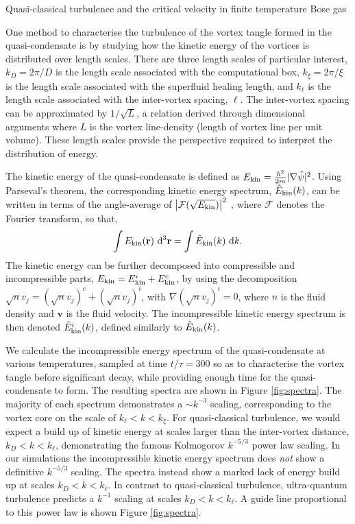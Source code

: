 \begin{chapter}{\label{cha:nonequib}Quasi-classical turbulence and the critical velocity in finite temperature Bose gas}
\begin{figure}
\end{figure}
One method to characterise the turbulence of the vortex tangle formed in the quasi-condensate is by studying how the kinetic energy of the vortices is distributed over length scales. There are three length scales of particular interest, $k_D=2\pi/D$ is the length scale associated with the computational box, $k_\xi = 2\pi/\xi$ is the length scale associated with the superfluid healing length, and $k_\ell$ is the length scale associated with the inter-vortex spacing, $\ell$. The inter-vortex spacing can be approximated by $1/\sqrt{L}$, a relation derived through dimensional arguments where $L$ is the vortex line-density (length of vortex line per unit volume). These length scales provide the perspective required to interpret the distribution of energy.

The kinetic energy of the quasi-condensate is defined as $E_{\rm kin} = \frac{\hbar^2}{2m}|\nabla \hat\psi|^2$.
 Using Parseval's theorem, the corresponding kinetic energy spectrum, $\hat{E}_{\rm kin}(k)$, can be written in terms of the angle-average of $\left |\mathcal{F}(\sqrt{E_{\rm kin}})\right |^2$ \cite{Nore},
where $\mathcal{F}$ denotes the Fourier transform, so that,
\begin{equation}
  \int E_{\rm kin}({\bf r})~{\rm d}^3{\bf r} = \int \hat{E}_{\rm kin}(k)~{\mathrm d}k.
  \label{eq:Ekin}
\end{equation}
The kinetic energy can be further decomposed into compressible and incompressible parts, $E_{\rm kin} = E^i_{\rm kin} + E^c_{\rm kin}$, by using the decomposition $\sqrt{n}v_j = (\sqrt{n}v_j)^c + (\sqrt{n}v_j)^i$, with $\nabla(\sqrt{n}v_j)^i=0$, where $n$ is the fluid density and $\mathbf{v}$ is the fluid velocity. The incompressible kinetic energy spectrum is then denoted $\hat{E}^i_{\rm kin}(k)$, defined similarly to $\hat{E}_{\rm kin}(k)$.

We calculate the incompressible energy spectrum of the quasi-condensate at various temperatures, sampled at time $t/\tau=300$ so as to characterise the vortex tangle before significant decay, while providing enough time for the quasi-condensate to form. The resulting spectra are shown in Figure \ref{fig:spectra}. The majority of each spectrum demonstrates a $\sim k^{-3}$ scaling, corresponding to the vortex core on the scale of $k_\ell<k<k_\xi$. For quasi-classical turbulence, we would expect a build up of kinetic energy at scales larger than the inter-vortex distance, $k_D<k<k_\ell$, demonstrating the famous Kolmogorov $k^{-5/3}$ power law scaling. In our simulations the incompressible kinetic energy spectrum does {\it not} show a definitive $k^{-5/3}$ scaling. The spectra instead show a marked lack of energy build up at scales $k_D<k<k_\ell$. In contrast to quasi-classical turbulence, ultra-quantum turbulence predicts a $k^{-1}$ scaling at scales $k_D<k<k_\ell$. A guide line proportional to this power law is shown Figure \ref{fig:spectra}.


\end{chapter}

